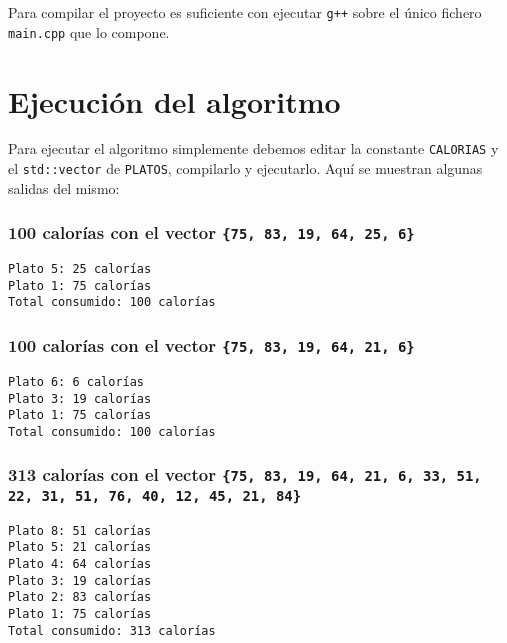 Para compilar el proyecto es suficiente con ejecutar \texttt{g++} sobre el único fichero \texttt{main.cpp} que lo compone.

\section{Ejecución del algoritmo}

Para ejecutar el algoritmo simplemente debemos editar la constante \texttt{CALORIAS} y el \texttt{std::vector} de \texttt{PLATOS}, compilarlo y ejecutarlo.
Aquí se muestran algunas salidas del mismo:

\subsubsection{$\boldsymbol{100}$ calorías con el vector \texttt{\{75, 83, 19, 64, 25, 6\}}}

\begin{lstlisting}
Plato 5: 25 calorías
Plato 1: 75 calorías
Total consumido: 100 calorías
\end{lstlisting}

\subsubsection{$\boldsymbol{100}$ calorías con el vector \texttt{\{75, 83, 19, 64, 21, 6\}}}

\begin{lstlisting}
Plato 6: 6 calorías
Plato 3: 19 calorías
Plato 1: 75 calorías
Total consumido: 100 calorías
\end{lstlisting}

\subsubsection{$\boldsymbol{313}$ calorías con el vector \texttt{\{75, 83, 19, 64, 21, 6, 33, 51, 22, 31, 51, 76, 40, 12, 45, 21, 84\}}}

\begin{lstlisting}
Plato 8: 51 calorías
Plato 5: 21 calorías
Plato 4: 64 calorías
Plato 3: 19 calorías
Plato 2: 83 calorías
Plato 1: 75 calorías
Total consumido: 313 calorías
\end{lstlisting}
